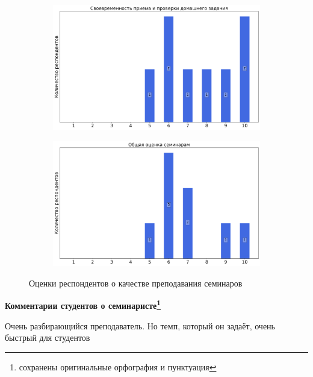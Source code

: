 \begin{figure}[H]
\begin{subfigure}[b]{0.45\textwidth}
                    \centering
                    \includegraphics[width=\textwidth]{images/3 course/Общая физика - квантовая физика/seminarists-marks-Колдунов М.Ф.-2.png}
                \end{subfigure}
                \begin{subfigure}[b]{0.45\textwidth}
                    \centering
                    \includegraphics[width=\textwidth]{images/3 course/Общая физика - квантовая физика/seminarists-marks-Колдунов М.Ф.-3.png}
                \end{subfigure}	
                \caption{Оценки респондентов о качестве преподавания семинаров}
            \end{figure}

            \textbf{Комментарии студентов о семинаристе\protect\footnote{сохранены оригинальные орфография и пунктуация}}
                \begin{commentbox} 
                    Очень разбирающийся преподаватель. Но темп, который он задаёт, очень быстрый для студентов 
                \end{commentbox} 
            
